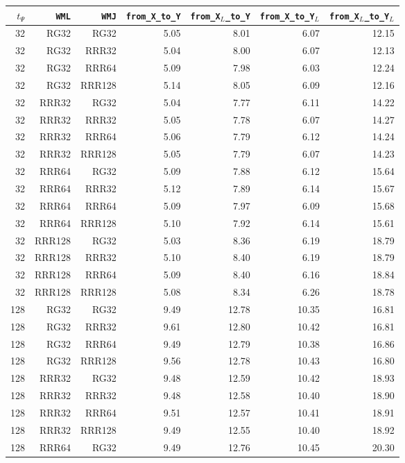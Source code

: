 \begin{table}
\begin{tabular}{|r|r|r|r|r|r|r|}
\hline
$t_{\Psi}$ & \texttt{WML} & \texttt{WMJ} & \texttt{from\_X\_to\_Y} & \texttt{from\_X$_{L}$\_to\_Y} & \texttt{from\_X\_to\_Y$_{L}$} & \texttt{from\_X$_{L}$\_to\_Y$_{L}$} \\
\hline
32 & RG32 & RG32 & 5.05 & 8.01 & 6.07 & 12.15 \\
32 & RG32 & RRR32 & 5.04 & 8.00 & 6.07 & 12.13 \\
32 & RG32 & RRR64 & 5.09 & 7.98 & 6.03 & 12.24 \\
32 & RG32 & RRR128 & 5.14 & 8.05 & 6.09 & 12.16 \\
32 & RRR32 & RG32 & 5.04 & 7.77 & 6.11 & 14.22 \\
32 & RRR32 & RRR32 & 5.05 & 7.78 & 6.07 & 14.27 \\
32 & RRR32 & RRR64 & 5.06 & 7.79 & 6.12 & 14.24 \\
32 & RRR32 & RRR128 & 5.05 & 7.79 & 6.07 & 14.23 \\
32 & RRR64 & RG32 & 5.09 & 7.88 & 6.12 & 15.64 \\
32 & RRR64 & RRR32 & 5.12 & 7.89 & 6.14 & 15.67 \\
32 & RRR64 & RRR64 & 5.09 & 7.97 & 6.09 & 15.68 \\
32 & RRR64 & RRR128 & 5.10 & 7.92 & 6.14 & 15.61 \\
32 & RRR128 & RG32 & 5.03 & 8.36 & 6.19 & 18.79 \\
32 & RRR128 & RRR32 & 5.10 & 8.40 & 6.19 & 18.79 \\
32 & RRR128 & RRR64 & 5.09 & 8.40 & 6.16 & 18.84 \\
32 & RRR128 & RRR128 & 5.08 & 8.34 & 6.26 & 18.78 \\
128 & RG32 & RG32 & 9.49 & 12.78 & 10.35 & 16.81 \\
128 & RG32 & RRR32 & 9.61 & 12.80 & 10.42 & 16.81 \\
128 & RG32 & RRR64 & 9.49 & 12.79 & 10.38 & 16.86 \\
128 & RG32 & RRR128 & 9.56 & 12.78 & 10.43 & 16.80 \\
128 & RRR32 & RG32 & 9.48 & 12.59 & 10.42 & 18.93 \\
128 & RRR32 & RRR32 & 9.48 & 12.58 & 10.40 & 18.90 \\
128 & RRR32 & RRR64 & 9.51 & 12.57 & 10.41 & 18.91 \\
128 & RRR32 & RRR128 & 9.49 & 12.55 & 10.40 & 18.92 \\
128 & RRR64 & RG32 & 9.49 & 12.76 & 10.45 & 20.30 \\

\end{tabular}
\end{table}
